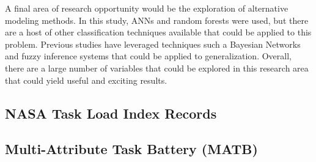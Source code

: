 \documentclass[11pt]{article}
\begin{document}
	A final area of research opportunity would be the exploration of alternative modeling methods. In this study, ANNs and random forests were used, but there are a host of other classification techniques available that could be applied to this problem. Previous studies have leveraged techniques such a Bayesian Networks and fuzzy inference systems that could be applied to generalization. Overall, there are a large number of variables that could be explored in this research area that could yield useful and exciting results.

\newpage


\pagebreak
\begin{appendices}
\appendixpage
\noappendicestocpagenum
\addappheadtotoc
\section{NASA Task Load Index Records}
	\subsection{Multi-Attribute Task Battery (MATB)}
		

\end{appendices}
\end{document}
